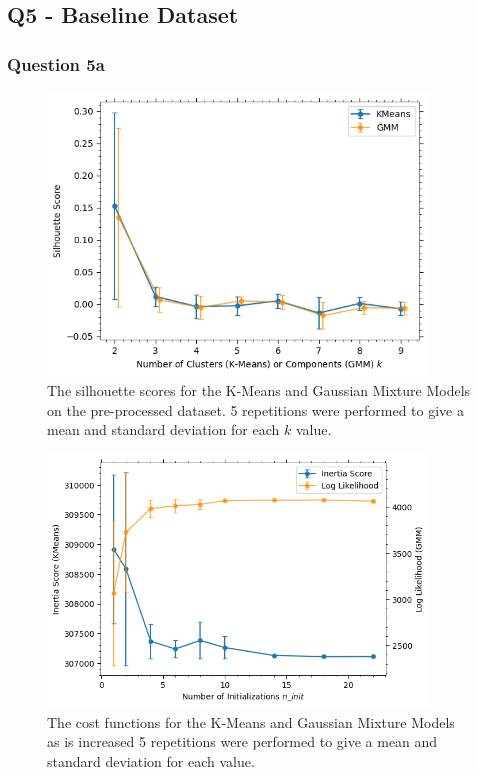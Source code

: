 
\subsection{Q5 - Baseline Dataset}\label{subsec:q5}
\subsubsection{Question 5a}\label{subsubsec:q5a}
    \begin{figure}[htb]
    \centering
    \includegraphics[width=0.9\textwidth]{./figures/q5a_silhouette_scores}
    \caption{The silhouette scores for the K-Means and Gaussian Mixture Models on the pre-processed
         dataset. 5 repetitions were performed to give a mean and standard deviation
        for each $k$ value.}
    \label{fig:q5a_silhouette_scores}
    \end{figure}

    \begin{figure}[htb]
    \centering
    \includegraphics[width=0.9\textwidth]{./figures/q5a_n_init_optimisation}
    \caption{The cost functions for the K-Means and Gaussian Mixture Models as  is increased
        5 repetitions were performed to give a mean and standard deviation for each  value.}
    \label{fig:q5a_n_init_optimisation}
    \end{figure}


